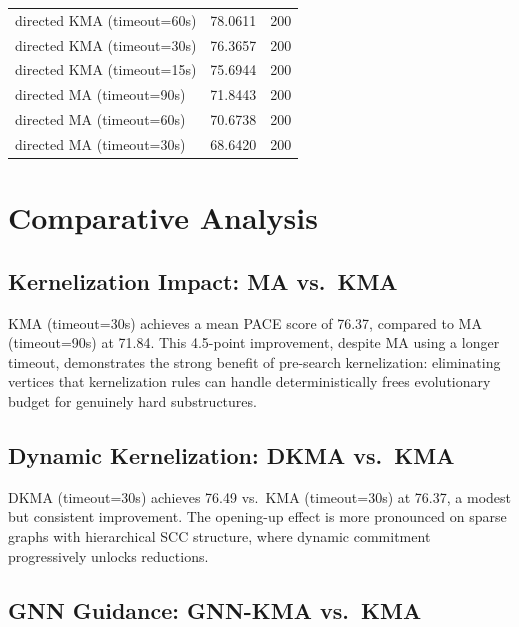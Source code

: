 \documentclass[10pt,a4paper]{report}
\theoremstyle{definition}
\begin{document}
\begin{table}[H]
\begin{tabular}{lcc}
		directed KMA (timeout=60s)                          & 78.0611                    & 200                        \\
		directed KMA (timeout=30s)                          & 76.3657                    & 200                        \\
		directed KMA (timeout=15s)                          & 75.6944                    & 200                        \\
		directed MA (timeout=90s)                           & 71.8443                    & 200                        \\
		directed MA (timeout=60s)                           & 70.6738                    & 200                        \\
		directed MA (timeout=30s)                           & 68.6420                    & 200                        \\
		\bottomrule
	\end{tabular}
\end{table}

\section{Comparative Analysis}

\subsection{Kernelization Impact: MA vs.\ KMA}

KMA (timeout=30s) achieves a mean PACE score of 76.37, compared to MA (timeout=90s) at 71.84. This 4.5-point improvement, despite MA using a longer timeout, demonstrates the strong benefit of pre-search kernelization: eliminating vertices that kernelization rules can handle deterministically frees evolutionary budget for genuinely hard substructures.

\subsection{Dynamic Kernelization: DKMA vs.\ KMA}

DKMA (timeout=30s) achieves 76.49 vs.\ KMA (timeout=30s) at 76.37, a modest but consistent improvement. The opening-up effect is more pronounced on sparse graphs with hierarchical SCC structure, where dynamic commitment progressively unlocks reductions.

\subsection{GNN Guidance: GNN-KMA vs.\ KMA}
\end{document}
